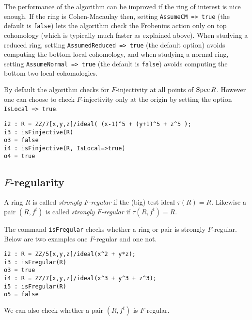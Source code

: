 \documentclass[11pt]{amsart}
\begin{document}
The performance of the algorithm can be improved if the ring of interest is
nice enough. If the ring is Cohen-Macaulay then, setting {\tt AssumeCM =>
true} (the default is {\tt false}) lets the algorithm check the Frobenius action only on top cohomology
(which is typically much faster as explained above).
When studying a reduced ring,  setting {\tt AssumedReduced => true} (the default option) avoids
computing the bottom local cohomology, and when studying a normal ring, setting
{\tt AssumeNormal => true} (the default is {\tt false}) avoids computing the bottom two local
cohomologies. 

By default the algorithm checks for $F$-injectivity at all points of $\operatorname{{Spec}} R$.  However one
can choose to check $F$-injectivity only at the origin by setting the
option {\tt IsLocal => true}.

\begin{verbatim}
i2 : R = ZZ/7[x,y,z]/ideal( (x-1)^5 + (y+1)^5 + z^5 );
i3 : isFinjective(R)
o3 = false
i4 : isFinjective(R, IsLocal=>true)
o4 = true
\end{verbatim}

\subsection{$F$-regularity}

\begin{definition}
A ring $R$ is called \emph{strongly $F$-regular} if the (big) test ideal $\tau(R) = R$.  Likewise a pair $(R, f^t)$ is called \emph{strongly $F$-regular} if $\tau(R, f^t) = R$.
\end{definition}


The command {\tt isFregular} checks whether a ring or pair is strongly
$F$-regular. Below are two examples one $F$-regular and one not.


\begin{verbatim}
i2 : R = ZZ/5[x,y,z]/ideal(x^2 + y*z);
i3 : isFregular(R)
o3 = true
i4 : R = ZZ/7[x,y,z]/ideal(x^3 + y^3 + z^3);
i5 : isFregular(R)
o5 = false
\end{verbatim}

We can also check whether a pair $(R, f^t)$ is $F$-regular.
\end{document}
